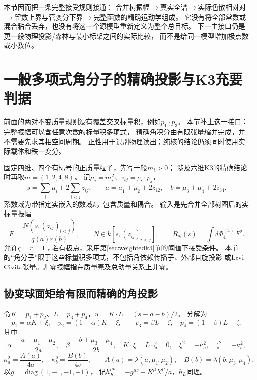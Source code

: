 \documentclass[11pt,a4paper]{ctexart}
\theoremstyle{cnplain}\newtheorem{theorem}{定理}[section]
\theoremstyle{definition}\newtheorem{definition}[theorem]{定义}
\theoremstyle{remark}\newtheorem{remark}[theorem]{注}
\begin{document}
本节因而把一条完整接受规则接通：
合并树振幅$\longrightarrow$真实全谱$\longrightarrow$实际色散相对对
$\longrightarrow$留数上界与管变分下界$\longrightarrow$完整函数的精确运动学组成。
它没有将全部常数或混合粘合丢弃，也没有将这一个源模型重新定义为整个总目标。
下一主接口仍是更一般物理投影/森林与最小标架之间的实际比较，
而不是给同一模型增加极点数或小数位。



\section{一般多项式角分子的精确投影与K3充要判据}\label{sec:angularpolynomial}
前面的两对不变质量规则没有覆盖交叉标量积，例如$p_1\cdot p_3$。
本节补上这一接口：完整振幅可以含任意次数的标量积多项式，
精确角积分由有限张量缩并完成，并不需要先求其相空间周期。
正性用于识别物理读出；纯核的结论仍须同时使用实际载体和秩一变分。

固定四维、四个有标号的正质量粒子，先写一般$m_i>0$；
涉及六维K3的精确结论时再取$m=(1,2,4,8)$。
记$\mu_i=m_i^2$、$z_{ij}=p_i\cdot p_j$，
\[
 s=\sum_i\mu_i+2\sum_{i<j}z_{ij},\qquad
 a=\mu_1+\mu_2+2z_{12},\quad b=\mu_3+\mu_4+2z_{34}.
\]
系数域为带指定实嵌入的数域$k$，包含质量和耦合。
输入是先合并全部树图后的实标量振幅
\[
 F=\frac{N(s,(z_{ij})_{i<j})}{q(a)r(b)},\qquad
 N\in k[s,(z_{ij})_{i<j}],
 \qquad R_N(s)=\int d\Phi_4^{(4)}\,F^2.
 \tag{AP}\label{eq:angularinput}
\]
允许$q=r=1$；若有极点，采用第\ref{sec:weightedk3}节的阈值下接受条件。
本节的“角分子”限于这些标量积多项式，不包括角依赖传播子、外部自旋投影
或Levi--Civita张量。非零振幅指在质量壳及总动量关系上非零。

\subsection{协变球面矩给有限而精确的角投影}
令$K=p_1+p_2$、$L=p_3+p_4$，$w=K\cdot L=(s-a-b)/2$。
分解为
\[
 p_1=\alpha K+\xi,\quad p_2=(1-\alpha)K-\xi,\qquad
 p_3=\beta L+\zeta,\quad p_4=(1-\beta)L-\zeta,
\]
其中
\[
 \alpha=\frac{a+\mu_1-\mu_2}{2a},\quad
 \beta=\frac{b+\mu_3-\mu_4}{2b},\quad
 K\cdot\xi=L\cdot\zeta=0,\quad
 \xi^2=-\kappa_a^2,\quad \zeta^2=-\kappa_b^2,
\]
\[
 \kappa_a^2=\frac{A(a)}{4a},\quad
 \kappa_b^2=\frac{B(b)}{4b},\qquad
 A(a)=\lambda(a,\mu_1,\mu_2),\quad B(b)=\lambda(b,\mu_3,\mu_4).
\]
以$g=\operatorname{diag}(1,-1,-1,-1)$，
记$h_K^{\mu\nu}=-g^{\mu\nu}+K^\mu K^\nu/a$，$h_L$同理。
\end{document}

